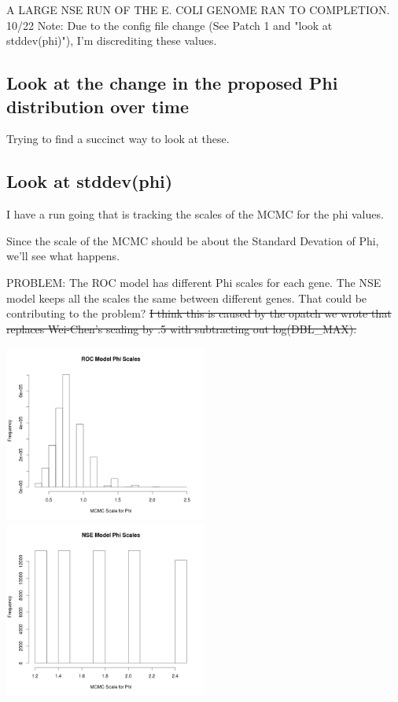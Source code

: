 A LARGE NSE RUN OF THE E. COLI GENOME RAN TO COMPLETION.
10/22 Note: Due to the config file change (See Patch 1 and "look at stddev(phi)"), I'm discrediting these values.

\subsection{Look at the change in the proposed Phi distribution over time}

Trying to find a succinct way to look at these.




\subsection{Look at stddev(phi)}

I have a run going that is tracking the scales of the MCMC for the phi values.

Since the scale of the MCMC should be about the Standard Devation of Phi, we'll see what happens.

PROBLEM:
The ROC model has different Phi scales for each gene. The NSE model keeps all the scales the same between different genes. That could be contributing to the problem? \sout{I think this is caused by the opatch we wrote that replaces Wei-Chen's scaling by .5  with subtracting out log(DBL\_MAX).}

\includegraphics[width=0.5\textwidth]{data/oct10-roc-scalehist.png}
\includegraphics[width=0.5\textwidth]{data/oct10-nse-scalehist.png}

